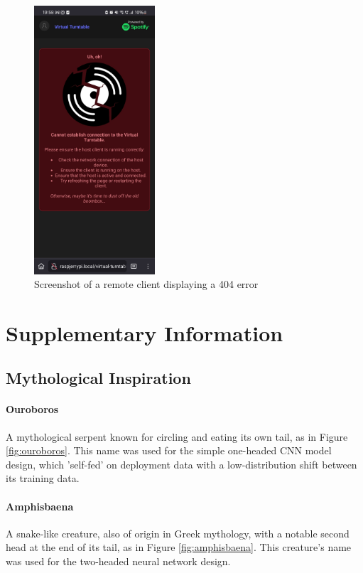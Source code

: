 \begin{uomappendix}
            \begin{figure}[h]
                \centering
                \includegraphics[width=0.4\textwidth]{images/screenshots/PHONE_Error.jpg}
                \caption{Screenshot of a remote client displaying a 404 error}
                \label{fig:phoneError}
            \end{figure}
    
    
        \section{Supplementary Information}
    
            \subsection{Mythological Inspiration} \label{app:Greek}
    
                \paragraph{Ouroboros} A mythological serpent known for circling and eating its own tail, as in Figure \ref{fig:ouroboros}. This name was used for the simple one-headed CNN model design, which 'self-fed' on deployment data with a low-distribution shift between its training data.
    
                \paragraph{Amphisbaena} A snake-like creature, also of origin in Greek mythology, with a notable second head at the end of its tail, as in Figure \ref{fig:amphisbaena}. This creature's name was used for the two-headed neural network design.
    

\end{uomappendix}
